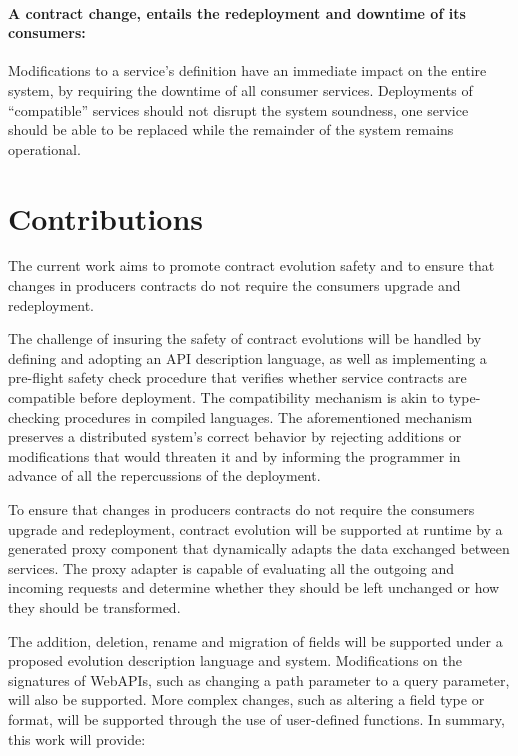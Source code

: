 \paragraph{ A contract change, entails the redeployment and downtime of its consumers:}
Modifications to a service's definition have an immediate impact on the entire system, by requiring the downtime of all consumer services.
Deployments of “compatible” services should not disrupt the system soundness,
one service should be able to be replaced while the remainder of the system remains operational.

\section{Contributions} %
\label{sec:contributions}

The current work aims to promote contract evolution safety and to ensure that changes in producers contracts do not require the consumers upgrade and redeployment.

The challenge of insuring the safety of contract evolutions will be handled by defining and adopting an API description language, as well as implementing
a pre-flight safety check procedure that verifies whether service contracts are compatible before deployment.
The compatibility mechanism is akin to type-checking procedures in compiled languages.
The aforementioned mechanism preserves a distributed system's correct behavior by rejecting additions or modifications that would threaten it and by informing the programmer in advance
of all the repercussions of the deployment.

To ensure that changes in producers contracts do not require the consumers upgrade and redeployment, contract evolution
will be supported at runtime by a generated proxy component that dynamically adapts the data exchanged between services.
The proxy adapter is capable of evaluating all the outgoing and incoming requests and determine whether
they should be left unchanged or how they should be transformed.

The addition, deletion, rename and migration of fields will be supported under a proposed evolution description language and system.
Modifications on the signatures of WebAPIs, such as changing a path parameter to a query parameter, will also be supported.
More complex changes, such as altering a field type or format,
will be supported through the use of user-defined functions.
In summary, this work will provide:

